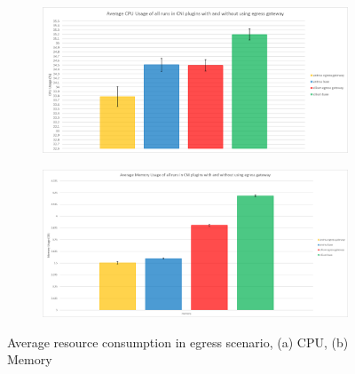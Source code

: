 \begin{figure}[H]
    \centering
    \begin{subfigure}[b]{0.9\textwidth}
        \includegraphics[width=\textwidth]{plots/egress/cpu_total_average.png}
        \caption{}
        \label{fig:cpu_avg}
    \end{subfigure}
    \begin{subfigure}[b]{0.9\textwidth}
        \includegraphics[width=\textwidth]{plots/egress/memory_total_average.png}
        \caption{}
        \label{fig:memory_avg}
    \end{subfigure}
    
    \caption{Average resource consumption in egress scenario, (a) CPU, (b) Memory}
    \label{fig:res_avg}
\end{figure}


